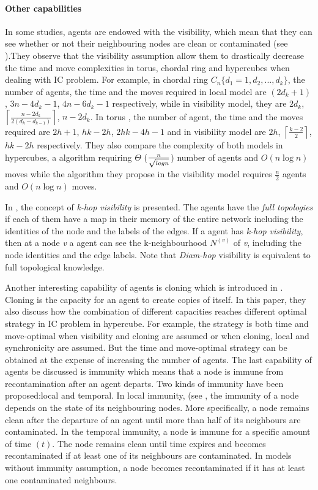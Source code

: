 \paragraph{Other capabilities}
In some studies, agents are endowed with the visibility, which mean that they can see whether or not their neighbouring nodes are clean or contaminated (see \cite{M.Huang, M.Huang1}).They observe that the visibility assumption allow them to drastically decrease the time and move complexities in torus, chordal ring and hypercubes when dealing with IC problem. For example, in chordal ring $C_n\{d_1=1,d_2,...,d_k\}$, the number of agents, the time and the moves required in local model are $(2d_k+1)$, $3n-4d_k-1$, $4n-6d_k-1$ respectively, while in visibility model, they are $2d_k$, $\left \lceil \frac{n-2d_{k}}{2(d_{k}-d_{k-1})} \right \rceil$, $n-2d_k$. In torus , the number of agent, the time and the moves required are $2h+1$, $hk-2h$, $2hk-4h-1$ and in visibility model are $2h$, $\left \lceil \frac{k-2}{2} \right \rceil$, $hk-2h$ respectively. They also compare the complexity of both models in hypercubes, a algorithm requiring $\Theta$  ($n \over { \sqrt {log n}} $) number of agents and $O(n \log n)$ moves while the algorithm they propose in the visibility model requires $\frac{n}{2}$ agents and $O(n \log n)$ moves.

In \cite{Cai3}, the concept of {\em k-hop visibility} is presented. The agents have the {\em full topologies} if each of them have a map in their memory  of the entire network including the identities of the node and the labels of the edges. If a agent has {\em k-hop visibility}, then at a node {\em v} a agent can see the k-neighbourhood $N^{(v)}$ of {\em v}, including the node identities and the edge labels. Note that {\em Diam-hop} visibility is equivalent to full topological knowledge. 

Another interesting capability of agents is cloning which is introduced in \cite{M.Huang1}. Cloning is the capacity for an agent to create copies of itself. In this paper, they also discuss how the combination of different capacities reaches different optimal strategy in IC problem in hypercube. For example, the strategy is both time and move-optimal when visibility and cloning are assumed or when cloning, local and synchronicity are assumed. But the time and move-optimal strategy can be obtained at the expense of increasing the number of agents.
The last capability of agents be discussed is immunity which means that a node is immune from recontamination after an agent departs. Two kinds of immunity have been proposed:local and temporal. In local immunity, (see
\cite{Flocchini6,N.Santoro}, the immunity of a node depends on the state of its neighbouring nodes. More specifically, a node remains clean after the departure of an agent until more than half of its neighbours are contaminated. In the temporal immunity, a node is immune for a specific amount of time $(t)$. The node remains clean until time expires and becomes recontaminated if at least one of its neighbours are contaminated. In models without immunity assumption, a node becomes recontaminated if it has at least one contaminated neighbours.

